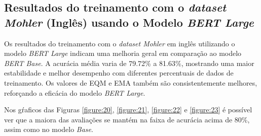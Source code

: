 \subsection{Resultados do treinamento com o \textit{dataset Mohler} (Inglês) usando o Modelo \textit{BERT Large}}

Os resultados do treinamento com o \textit{dataset Mohler} em inglês utilizando o modelo \textit{BERT Large} indicam uma melhoria geral em comparação ao modelo \textit{BERT Base}. A acurácia média varia de 79.72\% a 81.63\%, mostrando uma maior estabilidade e melhor desempenho com diferentes percentuais de dados de treinamento. Os valores de EQM e EMA também são consistentemente melhores, reforçando a eficácia do modelo \textit{BERT Large}.

\begin{table}[h!]
\centering
{}
\caption{Resultados de Regressão para Diferentes Percentuais de Treino com o \textit{dataset Mohler} (Inglês) usando o Modelo \textit{BERT Large}}
\label{tab:resultados_regressao_ingles_large}
\end{table}

Nos gŕaficos das Figuras \ref{figure:20}, \ref{figure:21}, \ref{figure:22} e \ref{figure:23} é possível ver que a maiora das avaliações se mantém na faixa de acurácia acima de 80\%, assim como no modelo \textit{Base}.



\FloatBarrier